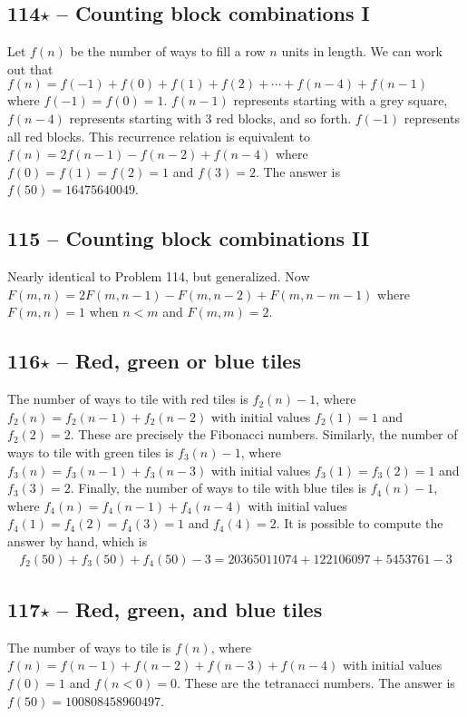 \documentclass{article}
\begin{document}
\subsection*{114$\star$ -- Counting block combinations I} 
Let $f(n)$ be the number of ways to fill a row $n$ units in length. 
We can work out that $f(n) = f(-1) + f(0) + f(1) + f(2) + \cdots + f(n-4) + f(n-1)$ where $f(-1) = f(0) = 1$. 
$f(n-1)$ represents starting with a grey square, $f(n-4)$ represents starting with 3 red blocks, and so forth.
$f(-1)$ represents all red blocks. 
This recurrence relation is equivalent to $f(n) = 2f(n-1) - f(n-2) + f(n-4)$ where $f(0) = f(1) = f(2) = 1$ and $f(3) = 2$. 
The answer is $f(50) = \boxed{16475640049}$.

\subsection*{115 -- Counting block combinations II} 
Nearly identical to Problem 114, but generalized. 
Now $F(m, n) = 2F(m, n-1) - F(m, n-2) + F(m, n-m-1)$ where $F(m, n) = 1$ when $n < m$ and $F(m, m) = 2$.

\subsection*{116$\star$ -- Red, green or blue tiles} 
The number of ways to tile with red tiles is $f_2(n)-1$, where $f_2(n) = f_2(n-1) + f_2(n-2)$ with initial values $f_2(1) = 1$ and $f_2(2) = 2$. 
These are precisely the Fibonacci numbers. 
Similarly, the number of ways to tile with green tiles is $f_3(n)-1$, where $f_3(n) = f_3(n-1) + f_3(n-3)$ with initial values $f_3(1) = f_3(2) = 1$ and $f_3(3) = 2$.  
Finally, the number of ways to tile with blue tiles is $f_4(n)-1$, where $f_4(n) = f_4(n-1) + f_4(n-4)$ with initial values $f_4(1) = f_4(2) = f_4(3) = 1$ and $f_4(4) = 2$. 
It is possible to compute the answer by hand, which is
\begin{align*}
	f_2(50) + f_3(50) + f_4(50) - 3 = \boxed{20365011074 + 122106097 + 5453761 - 3}
\end{align*}


\subsection*{117$\star$ -- Red, green, and blue tiles} 
The number of ways to tile is $f(n)$, where $f(n) = f(n-1) + f(n-2) + f(n-3) + f(n-4)$ with initial values $f(0) = 1$ and $f(n<0) = 0$. 
These are the tetranacci numbers. 
The answer is $f(50) = \boxed{100808458960497}$.
\end{document}

